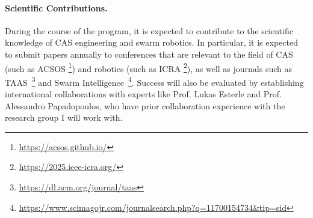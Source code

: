 \documentclass[12pt]{article}
\begin{document}
\paragraph{Scientific Contributions.}
During the course of the program, it is expected to contribute to the scientific knowledge of CAS engineering and swarm robotics. 
In particular, it is expected to submit papers annually to conferences that are relevant to the field of CAS (such as ACSOS \footnote{\url{https://acsos.github.io/}}) and robotics (such as ICRA \footnote{\url{https://2025.ieee-icra.org/}}),
as well as journals such as TAAS~\footnote{\url{https://dl.acm.org/journal/taas}} and Swarm Intelligence~\footnote{\url{https://www.scimagojr.com/journalsearch.php?q=11700154734&tip=sid}}.
Success will also be evaluated by establishing international collaborations with experts like Prof. Lukas Esterle and Prof. Alessandro Papadopoulos, who have prior collaboration experience with the research group I will work with.
\clearpage

\renewcommand{\refname}{References}



\end{document}
